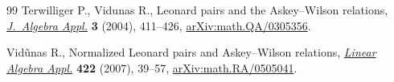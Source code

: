 \begin{thebibliography}{99}
Terwilliger P., Vidunas R., Leonard pairs and the {A}skey--{W}ilson relations,
 \href{https://doi.org/10.1142/S0219498804000940}{\textit{J.~Algebra Appl.}} \textbf{3} (2004), 411--426,
 \href{https://arxiv.org/abs/math.QA/0305356}{arXiv:math.QA/0305356}.

Vid\~unas R., Normalized {L}eonard pairs and {A}skey--{W}ilson relations,
 \href{https://doi.org/10.1016/j.laa.2005.12.033}{\textit{Linear Algebra Appl.}} \textbf{422} (2007), 39--57,
 \href{https://arxiv.org/abs/math.RA/0505041}{arXiv:math.RA/0505041}.

\end{thebibliography}
